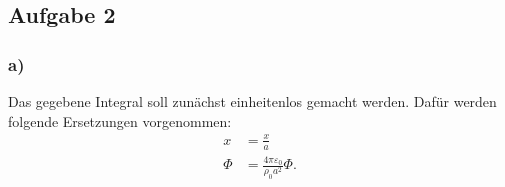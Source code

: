 \subsection*{Aufgabe 2}

\subsubsection*{a)}

Das gegebene Integral soll zunächst einheitenlos gemacht werden. Dafür werden folgende Ersetzungen vorgenommen:
\begin{align*}
    \overset{~}{x} &= \frac{x}{a} \\
    \overset{~}{\Phi} &= \frac{4 \pi \varepsilon_0}{\rho_0 a^2} \Phi.
\end{align*}

